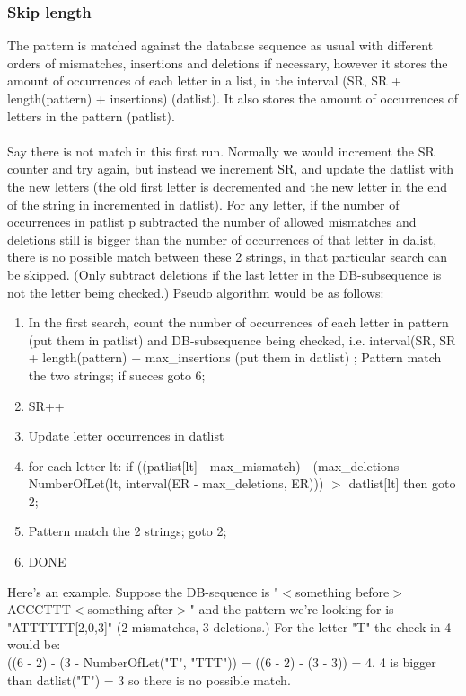 \documentclass[12pt]{article}
\begin{document}
\subsubsection{Skip length}
The pattern is matched against the database sequence as usual with different orders of mismatches, insertions and
deletions if necessary, however it stores the amount of occurrences of each letter in a list, in the interval
(SR, SR + length(pattern) + insertions) (datlist). 
It also stores the amount of occurrences of letters in the pattern (patlist). \\ \\
Say there is not match in this first run. Normally we would increment the SR counter and try again, but instead we
increment SR, and update the datlist with the new letters (the old first letter is decremented and the new letter in the
end of the string in incremented in datlist). For any letter, if the number of occurrences in patlist p subtracted the
number of allowed mismatches and deletions still is bigger than the number of occurrences of that letter in dalist, there is no 
possible match between these 2 strings, in that particular search can be skipped. (Only subtract deletions if the last letter
in the DB-subsequence is not the letter being checked.) Pseudo algorithm would be as follows: 
\begin{enumerate}
\item In the first search, count the number of occurrences of each letter in pattern (put them in patlist) 
and DB-subsequence being checked, i.e. interval(SR, SR + length(pattern) + max\_insertions (put them in datlist)
; Pattern match the two strings; if succes goto 6;
\item SR++
\item Update letter occurrences in datlist
\item for each letter lt: if ((patlist[lt] - max\_mismatch) - (max\_deletions - 
NumberOfLet(lt, interval(ER - max\_deletions, ER))) $>$ datlist[lt] then goto 2;
\item Pattern match the 2 strings; goto 2;
\item DONE
\end{enumerate}
Here's an example. Suppose the DB-sequence is "$<$something before$>$ACCCTTT$<$something after$>$" and the pattern we're
looking for is "ATTTTTT[2,0,3]" (2 mismatches, 3 deletions.) For the letter "T" the check in 4 would be: \\
((6 - 2) - (3 - NumberOfLet("T", "TTT")) = ((6 - 2) - (3 - 3)) = 4. 4 is bigger than datlist("T") = 3 so there is no
possible match.
\end{document}
